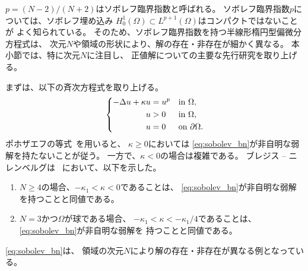 $p = (N-2)/(N+2)$はソボレフ臨界指数と呼ばれる。
ソボレフ臨界指数$p$については、ソボレフ埋め込み
$H^1_0(\Omega) \subset L^{p+1}(\Omega)$はコンパクトではないことが
よく知られている。
そのため、ソボレフ臨界指数を持つ半線形楕円型偏微分方程式は、
次元$N$や領域の形状により、解の存在・非存在が細かく異なる。
本小節では、特に次元$N$に注目し、
正値解についての主要な先行研究を取り上げる。

まずは、以下の斉次方程式を取り上げる。
\begin{align}
 \left\{
 \begin{aligned}
  -\Delta u + \kappa u &= u^p & &\text{in}~ \Omega,  \\
  u &> 0 & &\text{in}~ \Omega, \\
  u &= 0 & &\text{on}~ \partial\Omega.
 \end{aligned}
 \right. \label{eq:sobolev_bn}
\end{align}
ポホザエフの等式~\cite{MR0192184}を用いると、
$\kappa \geq 0$においては
\eqref{eq:sobolev_bn}が非自明な弱解を持たないことが従う。
一方で、$\kappa < 0$の場合は複雑である。
ブレジス -- ニレンベルグは
\cite{MR709644}~において、以下を示した。
\begin{enumerate}[1.] \sage
 \item $N \geq 4$の場合、$-\kappa_1 < \kappa < 0$であることは、
       \eqref{eq:sobolev_bn}が非自明な弱解を持つことと同値である。
 \item $N = 3$かつ$\Omega$が球である場合、
       $-\kappa_1 < \kappa < -\kappa_1/4$であることは、
       \eqref{eq:sobolev_bn}が非自明な弱解を
       持つことと同値である。
\end{enumerate}
\eqref{eq:sobolev_bn}は、
領域の次元$N$により解の存在・非存在が異なる例となっている。

